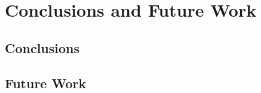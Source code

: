 \documentclass{scrartcl}
\begin{document}
\section{Conclusions and Future Work}
\subsection{Conclusions}
   
    	\subsection{Future Work		}
    	


\newpage


\printbibliography[heading=bibintoc]


\pagebreak









  	
  
  	

  	
  	
  	
  
  	
  	
  	
  
  	
  	
  
  	


  	





	
	
	




 









 

 
\end{document}
